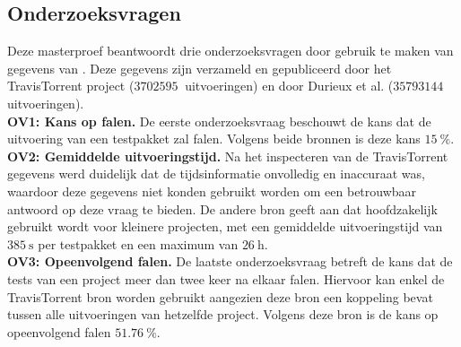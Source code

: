 \subsection{Onderzoeksvragen}
\noindent Deze masterproef beantwoordt drie onderzoeksvragen door gebruik te maken van gegevens van \travisci{}. Deze gegevens zijn verzameld en gepubliceerd door het TravisTorrent project \cite{msr17challenge} ($\SI{3702595}{}$ uitvoeringen) en door Durieux et al. \cite{travisanalysis} ($\SI{35793144}{}$ uitvoeringen).\\

\noindent \textbf{OV1: Kans op falen.}
De eerste onderzoeksvraag beschouwt de kans dat de uitvoering van een testpakket zal falen. Volgens beide bronnen is deze kans $\SI{15}{\percent}$.\\

\noindent \textbf{OV2: Gemiddelde uitvoeringstijd.}
Na het inspecteren van de TravisTorrent gegevens werd duidelijk dat de tijdsinformatie onvolledig en inaccuraat was, waardoor deze gegevens niet konden gebruikt worden om een betrouwbaar antwoord op deze vraag te bieden. De andere bron geeft aan dat \travisci{} hoofdzakelijk gebruikt wordt voor kleinere projecten, met een gemiddelde uitvoeringstijd van $\SI{385}{\second}$ per testpakket en een maximum van $\SI{26}{\hour}$.\\

\noindent \textbf{OV3: Opeenvolgend falen.}
De laatste onderzoeksvraag betreft de kans dat de tests van een project meer dan twee keer na elkaar falen. Hiervoor kan enkel de TravisTorrent bron worden gebruikt aangezien deze bron een koppeling bevat tussen alle uitvoeringen van hetzelfde project. Volgens deze bron is de kans op opeenvolgend falen $\SI{51.76}{\percent}$.